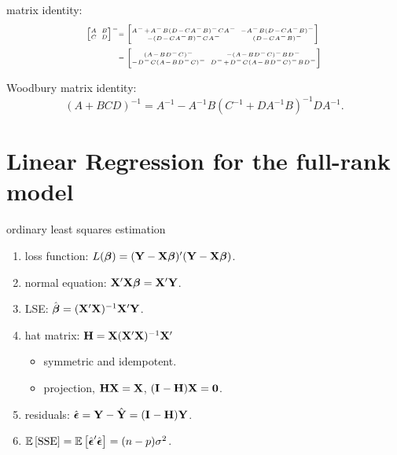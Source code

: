 matrix identity: $$
    \tiny
    \setlength\arraycolsep{1ex}
    \begin{aligned}
        \begin{bmatrix}
            A & B \\
            C & D \\
        \end{bmatrix}^{-}
        & \hspace{-1ex}= \begin{bmatrix}
            A^- \!+\! A^- B (D \!-\! C A^- B)^- C A^- & 
            -A^- B (D \!-\! C A^- B)^- \\
            -(D \!-\! C A^- B)^- C A^- & 
            (D \!-\! C A^- B)^- \\
        \end{bmatrix} \\
        & \hspace{-1ex}= \begin{bmatrix}
            (A \!-\! B D^- C)^- &
            -(A \!-\! B D^- C)^- B D^- \\
            -D^- C (A \!-\! B D^- C)^- & 
            D^- \!+\! D^- C (A \!-\! B D^- C)^- B D^-
        \end{bmatrix}
    \end{aligned}
$$





Woodbury matrix identity: $$
    (A + BCD)^{-1} = A^{-1} - A^{-1}B(C^{-1} + D A^{-1} B)^{-1} D A^{-1}.
$$


\newcol 

\section*{Linear Regression for the full-rank model}

ordinary least squares estimation \begin{enumerate}
    \item loss function: $L(\boldsymbol{\beta}) = (\mathbf{Y} - \mathbf{X}\boldsymbol{\beta})'(\mathbf{Y} - \mathbf{X}\boldsymbol{\beta})$.
    \item normal equation: $\mathbf{X}' \mathbf{X} \boldsymbol{\beta} = \mathbf{X}'\mathbf{Y}$.
    \item LSE: $\hat{\boldsymbol{\beta}} = (\mathbf{X}'\mathbf{X})^{-1}\mathbf{X}'\mathbf{Y}$.
    \item hat matrix: $\mathbf{H} = \mathbf{X} (\mathbf{X}' \mathbf{X})^{-1} \mathbf{X}'$ \begin{itemize}
        \item symmetric and idempotent.
        \item projection, $\mathbf{H} \mathbf{X} = \mathbf{X}$, $(\mathbf{I}_{} - \mathbf{H}) \mathbf{X} = \mathbf{0}$.
    \end{itemize}
    \item residuals: $\hat{\boldsymbol{\epsilon}} = \mathbf{Y} - \hat{\mathbf{Y}} = (\mathbf{I}_{} - \mathbf{H}) \mathbf{Y}$.
    \item [] $\mathbb{E}\left[ \text{SSE} \right] = \mathbb{E}\left[ {\hat{\boldsymbol{\epsilon}}'\hat{\boldsymbol{\epsilon}}} \right] = (n-p)\sigma^2$.
\end{enumerate}

